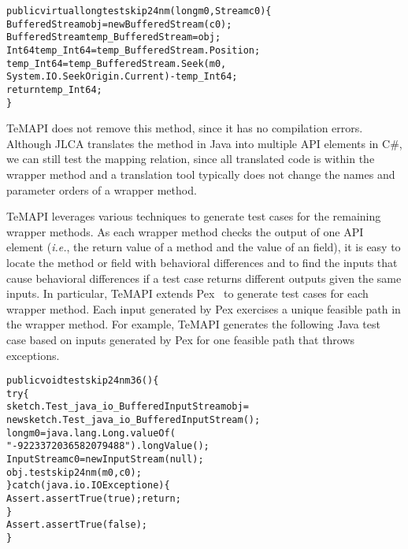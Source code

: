 \begin{CodeOut}
\begin{alltt}
public virtual long testskip24nm(long m0, Stream c0)\{
  BufferedStream obj = new BufferedStream(c0);
  BufferedStream temp_BufferedStream = obj;
  Int64 temp_Int64 = temp_BufferedStream.Position;
  temp_Int64 = temp_BufferedStream.Seek(m0,
       System.IO.SeekOrigin.Current) - temp_Int64;
  return temp_Int64;
\}
\end{alltt}
\end{CodeOut}\vspace*{-2ex}

TeMAPI does not remove this method, since it has no compilation errors. Although JLCA translates the  method in Java into multiple API elements in C\#, we can still test the mapping relation, since all translated code is within the wrapper method and a translation tool typically does not change the names and parameter orders of a wrapper method.

TeMAPI leverages various techniques to generate test cases for the remaining wrapper methods. As each wrapper method checks the output of one API element (\emph{i.e.}, the return value of a method and the value of an field), it is easy to locate the method or field with behavioral differences and to find the inputs that cause behavioral differences if a test case returns different outputs given the same inputs. In particular, TeMAPI extends Pex~\cite{tillmann2008pex} to generate test cases for each wrapper method. Each input generated by Pex exercises a unique feasible path in the wrapper method. For example, TeMAPI generates the following Java test case based on inputs generated by Pex for one feasible path that throws exceptions.

\begin{CodeOut}\vspace*{-1ex}
\begin{alltt}
public void testskip24nm36()\{
  try\{
     sketch.Test_java_io_BufferedInputStream obj =
        new sketch.Test_java_io_BufferedInputStream();
     long m0 = java.lang.Long.valueOf(
                  "-9223372036582079488").longValue();
     InputStream c0 = new InputStream(null);
     obj.testskip24nm(m0,c0);
  \}catch(java.io.IOException e)\{
     Assert.assertTrue(true);return;
  \}
  Assert.assertTrue(false);
\}
\end{alltt}
\end{CodeOut}\vspace*{-2ex}


